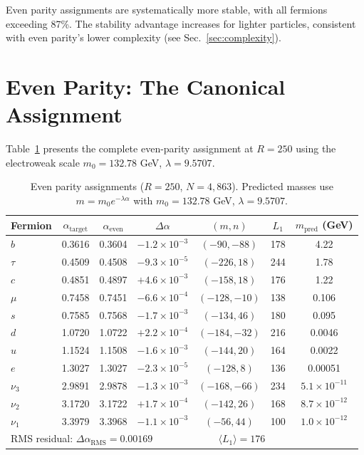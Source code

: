 \documentclass[11pt,a4paper]{article}
\begin{document}
Even parity assignments are systematically more stable, with all fermions exceeding 87\%. The stability advantage increases for lighter particles, consistent with even parity's lower complexity (see Sec.~\ref{sec:complexity}).

\section{Even Parity: The Canonical Assignment}
\label{sec:even}

Table~\ref{tab:even} presents the complete even-parity assignment at $R=250$ using the electroweak scale $m_0 = 132.78$ GeV, $\lambda = 9.5707$.

\begin{table}[h!]
\centering
\caption{Even parity assignments ($R=250$, $N=4{,}863$). Predicted masses use $m = m_0 e^{-\lambda\alpha}$ with $m_0 = 132.78$ GeV, $\lambda = 9.5707$.}
\label{tab:even}
\small
\begin{tabular}{lcccccc}
\toprule
Fermion & $\alpha_{\text{target}}$ & $\alpha_{\text{even}}$ & $\Delta\alpha$ & $(m,n)$ & $L_1$ & $m_{\text{pred}}$ (GeV) \\
\midrule
$b$ & 0.3616 & 0.3604 & $-1.2\times10^{-3}$ & $(-90,-88)$ & 178 & 4.22 \\
$\tau$ & 0.4509 & 0.4508 & $-9.3\times10^{-5}$ & $(-226,18)$ & 244 & 1.78 \\
$c$ & 0.4851 & 0.4897 & $+4.6\times10^{-3}$ & $(-158,18)$ & 176 & 1.22 \\
$\mu$ & 0.7458 & 0.7451 & $-6.6\times10^{-4}$ & $(-128,-10)$ & 138 & 0.106 \\
$s$ & 0.7585 & 0.7568 & $-1.7\times10^{-3}$ & $(-134,46)$ & 180 & 0.095 \\
$d$ & 1.0720 & 1.0722 & $+2.2\times10^{-4}$ & $(-184,-32)$ & 216 & 0.0046 \\
$u$ & 1.1524 & 1.1508 & $-1.6\times10^{-3}$ & $(-144,20)$ & 164 & 0.0022 \\
$e$ & 1.3027 & 1.3027 & $-2.3\times10^{-5}$ & $(-128,8)$ & 136 & 0.00051 \\
$\nu_3$ & 2.9891 & 2.9878 & $-1.3\times10^{-3}$ & $(-168,-66)$ & 234 & $5.1\times10^{-11}$ \\
$\nu_2$ & 3.1720 & 3.1722 & $+1.7\times10^{-4}$ & $(-142,26)$ & 168 & $8.7\times10^{-12}$ \\
$\nu_1$ & 3.3979 & 3.3968 & $-1.1\times10^{-3}$ & $(-56,44)$ & 100 & $1.0\times10^{-12}$ \\
\midrule
\multicolumn{4}{l}{RMS residual: $\Delta\alpha_{\text{RMS}} = 0.00169$} & \multicolumn{2}{c}{$\langle L_1 \rangle = 176$} \\
\bottomrule
\end{tabular}
\end{table}
\end{document}

